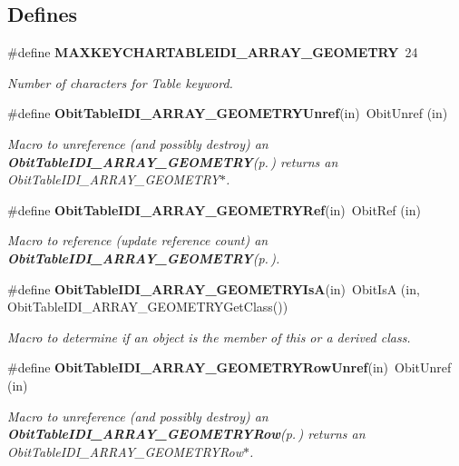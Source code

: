 \subsection*{Defines}
\begin{CompactItemize}
\item 
\#define {\bf MAXKEYCHARTABLEIDI\_\-ARRAY\_\-GEOMETRY}\ 24
\begin{CompactList}\small\item\em Number of characters for Table keyword. \item\end{CompactList}\item 
\#define {\bf Obit\-Table\-IDI\_\-ARRAY\_\-GEOMETRYUnref}(in)\ Obit\-Unref (in)
\begin{CompactList}\small\item\em Macro to unreference (and possibly destroy) an {\bf Obit\-Table\-IDI\_\-ARRAY\_\-GEOMETRY}{\rm (p.\,\pageref{structObitTableIDI__ARRAY__GEOMETRY})} returns an Obit\-Table\-IDI\_\-ARRAY\_\-GEOMETRY$\ast$. \item\end{CompactList}\item 
\#define {\bf Obit\-Table\-IDI\_\-ARRAY\_\-GEOMETRYRef}(in)\ Obit\-Ref (in)
\begin{CompactList}\small\item\em Macro to reference (update reference count) an {\bf Obit\-Table\-IDI\_\-ARRAY\_\-GEOMETRY}{\rm (p.\,\pageref{structObitTableIDI__ARRAY__GEOMETRY})}. \item\end{CompactList}\item 
\#define {\bf Obit\-Table\-IDI\_\-ARRAY\_\-GEOMETRYIs\-A}(in)\ Obit\-Is\-A (in, Obit\-Table\-IDI\_\-ARRAY\_\-GEOMETRYGet\-Class())
\begin{CompactList}\small\item\em Macro to determine if an object is the member of this or a derived class. \item\end{CompactList}\item 
\#define {\bf Obit\-Table\-IDI\_\-ARRAY\_\-GEOMETRYRow\-Unref}(in)\ Obit\-Unref (in)
\begin{CompactList}\small\item\em Macro to unreference (and possibly destroy) an {\bf Obit\-Table\-IDI\_\-ARRAY\_\-GEOMETRYRow}{\rm (p.\,\pageref{structObitTableIDI__ARRAY__GEOMETRYRow})} returns an Obit\-Table\-IDI\_\-ARRAY\_\-GEOMETRYRow$\ast$. \item\end{CompactList}\item 

\end{CompactItemize}
